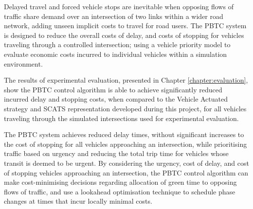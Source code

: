 Delayed travel and forced vehicle stops are inevitable when opposing flows of traffic share demand over an intersection of two links within a wider road network, adding unseen implicit costs to travel for road users. The PBTC system is designed to reduce the overall costs of delay, and costs of stopping for vehicles traveling through a controlled intersection; using a vehicle priority model to evaluate economic costs incurred to individual vehicles within a simulation environment.

The results of experimental evaluation, presented in Chapter \ref{chapter:evaluation}, show the PBTC control algorithm is able to achieve significantly reduced incurred delay and stopping costs, when compared to the Vehicle Actuated strategy and SCATS representation developed during this project, for all vehicles traveling through the simulated intersections used for experimental evaluation. 

The PBTC system achieves reduced delay times, without significant increases to the cost of stopping for all vehicles approaching an intersection, while prioritising traffic based on urgency and reducing the total trip time for vehicles whose transit is deemed to be urgent. By considering the urgency, cost of delay, and cost of stopping vehicles approaching an intersection, the PBTC control algorithm can make cost-minimising decisions regarding allocation of green time to opposing flows of traffic, and use a lookahead optimisation technique to schedule phase changes at times that incur locally minimal costs.







